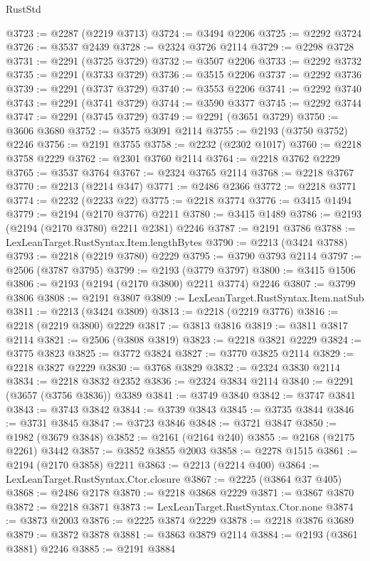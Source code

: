 \begin{lexlean}{RustStd}
\begin{coremodule}
{\begin{coremodule}
{{{{{{{{{{{{{{{{{{{{{{{{{{@3723 := @2287 (@2219 @3713)
@3724 := @3494 @2206
@3725 := @2292 @3724
@3726 := @3537 @2439
@3728 := @2324 @3726 @2114
@3729 := @2298 @3728
@3731 := @2291 (@3725 @3729)
@3732 := @3507 @2206
@3733 := @2292 @3732
@3735 := @2291 (@3733 @3729)
@3736 := @3515 @2206
@3737 := @2292 @3736
@3739 := @2291 (@3737 @3729)
@3740 := @3553 @2206
@3741 := @2292 @3740
@3743 := @2291 (@3741 @3729)
@3744 := @3590 @3377
@3745 := @2292 @3744
@3747 := @2291 (@3745 @3729)
@3749 := @2291 (@3651 @3729)
@3750 := @3606 @3680
@3752 := @3575 @3091 @2114
@3755 := @2193 (@3750 @3752) @2246
@3756 := @2191 @3755
@3758 := @2232 (@2302 @1017)
@3760 := @2218 @3758 @2229
@3762 := @2301 @3760 @2114
@3764 := @2218 @3762 @2229
@3765 := @3537 @3764
@3767 := @2324 @3765 @2114
@3768 := @2218 @3767
@3770 := @2213 (@2214 @347)
@3771 := @2486 @2366
@3772 := @2218 @3771
@3774 := @2232 (@2233 @22)
@3775 := @2218 @3774
@3776 := @3415 @1494
@3779 := @2194 (@2170 @3776) @2211
@3780 := @3415 @1489
@3786 := @2193 (@2194 (@2170 @3780) @2211 @2381) @2246
@3787 := @2191 @3786
@3788 := LexLeanTarget.RustSyntax.Item.lengthBytes
@3790 := @2213 (@3424 @3788)
@3793 := @2218 (@2219 @3780) @2229
@3795 := @3790 @3793 @2114
@3797 := @2506 (@3787 @3795)
@3799 := @2193 (@3779 @3797)
@3800 := @3415 @1506
@3806 := @2193 (@2194 (@2170 @3800) @2211 @3774) @2246
@3807 := @3799 @3806
@3808 := @2191 @3807
@3809 := LexLeanTarget.RustSyntax.Item.natSub
@3811 := @2213 (@3424 @3809)
@3813 := @2218 (@2219 @3776)
@3816 := @2218 (@2219 @3800) @2229
@3817 := @3813 @3816
@3819 := @3811 @3817 @2114
@3821 := @2506 (@3808 @3819)
@3823 := @2218 @3821 @2229
@3824 := @3775 @3823
@3825 := @3772 @3824
@3827 := @3770 @3825 @2114
@3829 := @2218 @3827 @2229
@3830 := @3768 @3829
@3832 := @2324 @3830 @2114
@3834 := @2218 @3832 @2352
@3836 := @2324 @3834 @2114
@3840 := @2291 (@3657 (@3756 @3836)) @3389
@3841 := @3749 @3840
@3842 := @3747 @3841
@3843 := @3743 @3842
@3844 := @3739 @3843
@3845 := @3735 @3844
@3846 := @3731 @3845
@3847 := @3723 @3846
@3848 := @3721 @3847
@3850 := @1982 (@3679 @3848)
@3852 := @2161 (@2164 @240)
@3855 := @2168 (@2175 @2261) @3442
@3857 := @3852 @3855 @2003
@3858 := @2278 @1515
@3861 := @2194 (@2170 @3858) @2211
@3863 := @2213 (@2214 @400)
@3864 := LexLeanTarget.RustSyntax.Ctor.closure
@3867 := @2225 (@3864 @37 @405)
@3868 := @2486 @2178
@3870 := @2218 @3868 @2229
@3871 := @3867 @3870
@3872 := @2218 @3871
@3873 := LexLeanTarget.RustSyntax.Ctor.none
@3874 := @3873 @2003
@3876 := @2225 @3874 @2229
@3878 := @2218 @3876 @3689
@3879 := @3872 @3878
@3881 := @3863 @3879 @2114
@3884 := @2193 (@3861 @3881) @2246
@3885 := @2191 @3884
}}}}}}}}}}}}}}}}}}}}}}}}}}
\end{coremodule}}
\end{coremodule}
\end{lexlean}
